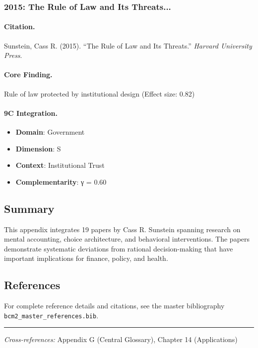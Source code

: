 \subsubsection{2015: The Rule of Law and Its Threats...}

\paragraph{Citation.}
Sunstein, Cass R. (2015). ``The Rule of Law and Its Threats.''
\textit{Harvard University Press}.

\paragraph{Core Finding.}
Rule of law protected by institutional design (Effect size: 0.82)

\paragraph{9C Integration.}
\begin{itemize}[nosep]
  \item \textbf{Domain}: Government
  \item \textbf{Dimension}: S
  \item \textbf{Context}: Institutional Trust
  \item \textbf{Complementarity}: γ = 0.60
\end{itemize}

\subsection{Summary}

This appendix integrates 19 papers by Cass R. Sunstein
spanning research on mental accounting, choice architecture, and behavioral
interventions. The papers demonstrate systematic deviations from rational
decision-making that have important implications for finance, policy, and health.

\subsection{References}

For complete reference details and citations, see the master bibliography
\texttt{bcm2\_master\_references.bib}.

\vspace{1em}
\hrule
\vspace{0.5em}

\noindent\textit{Cross-references:}
Appendix G (Central Glossary), Chapter 14 (Applications)
